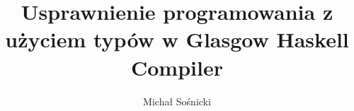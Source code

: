 \documentclass[a4paper,12pt,twoside]{book}
\author{Michał Sośnicki}
\title{Usprawnienie programowania z użyciem typów w Glasgow Haskell Compiler}
\begin{document}
\frontmatter

\tableofcontents

\mainmatter
\pagestyle{headings}









\listoffigures
\lstlistoflistings

\appendix
\renewcommand{\chaptermark}[1]{%
\markboth{\MakeUppercase{%
DODATEK \thechapter.%
\ }}{}}

\end{document}
